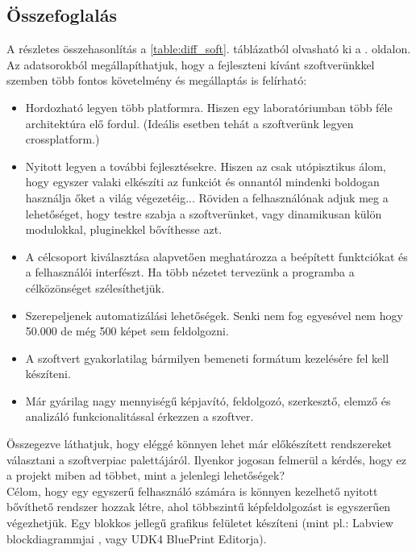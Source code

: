 \documentclass[a4paper,12pt,oneside]{report}
\begin{document}
\subsection{Összefoglalás}
A részletes összehasonlítás a \ref{table:diff_soft}. táblázatból olvasható ki a \pageref{table:diff_soft}. oldalon.\\
Az adatsorokból megállapíthatjuk, hogy a fejleszteni kívánt szoftverünkkel szemben több fontos követelmény és megállaptás is felírható:
\begin{itemize}
	\itemsep0em
	\item Hordozható legyen több platformra. Hiszen egy laboratóriumban több féle architektúra elő fordul. (Ideális esetben tehát a szoftverünk legyen crossplatform.)
	\item Nyitott legyen a további fejlesztésekre. Hiszen az csak utópisztikus álom, hogy egyszer valaki elkészíti az funkciót és onnantól mindenki boldogan használja őket a világ végezetéig... Röviden a felhasználónak adjuk meg a lehetőséget, hogy testre szabja a szoftverünket, vagy dinamikusan külön modulokkal, pluginekkel bővíthesse azt.
	\item A célcsoport kiválasztása alapvetően meghatározza a beépített funktciókat és a felhasználói interfészt. Ha több nézetet tervezünk a programba a célközönséget szélesíthetjük.
	\item Szerepeljenek automatizálási lehetőségek. Senki nem fog egyesével nem hogy 50.000 de még 500 képet sem feldolgozni.
	\item A szoftvert gyakorlatilag bármilyen bemeneti formátum kezelésére fel kell készíteni.
	\item Már gyárilag nagy mennyiségű képjavító, feldolgozó, szerkesztő, elemző és analizáló funkcionalitással érkezzen a szoftver.

\end{itemize}

Összegezve láthatjuk, hogy eléggé könnyen lehet már előkészített rendszereket választani a szoftverpiac palettájáról. Ilyenkor jogosan felmerül a kérdés, hogy ez a projekt miben ad többet, mint a jelenlegi lehetőségek? \\
Célom, hogy egy egyszerű felhasználó számára is könnyen kezelhető nyitott bővíthető rendszer hozzak létre, ahol többszintű képfeldolgozást is egyszerűen végezhetjük. Egy blokkos jellegű grafikus felületet készíteni (mint pl.: Labview blockdiagrammjai \cite{website:ni_blocks}, vagy UDK4 BluePrint Editorja\cite{website:udk_blueprint}).
\end{document}
